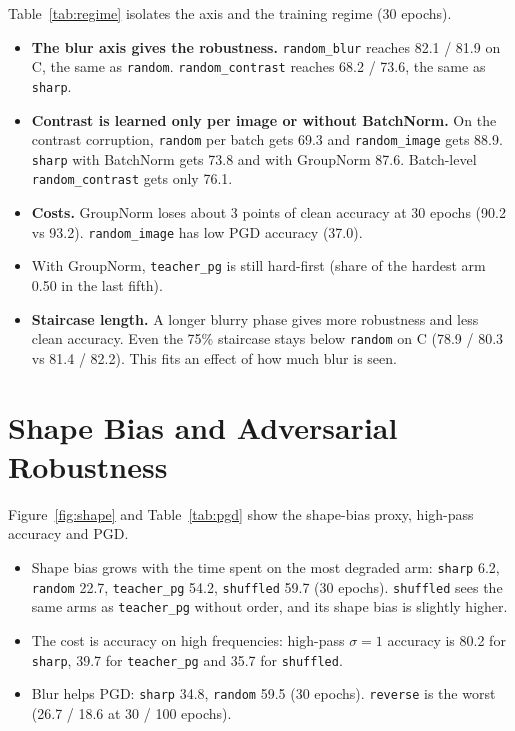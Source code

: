 \documentclass[a4paper,12pt]{report}
\newcommand{\cond}[1]{\texttt{#1}}
\begin{document}
Table~\ref{tab:regime} isolates the axis and the training regime (30 epochs).
\begin{itemize}
\item \textbf{The blur axis gives the robustness.} \cond{random\_blur} reaches 82.1 / 81.9 on C, the same as \cond{random}. \cond{random\_contrast} reaches 68.2 / 73.6, the same as \cond{sharp}.
\item \textbf{Contrast is learned only per image or without BatchNorm.} On the contrast corruption, \cond{random} per batch gets 69.3 and \cond{random\_image} gets 88.9. \cond{sharp} with BatchNorm gets 73.8 and with GroupNorm 87.6. Batch-level \cond{random\_contrast} gets only 76.1.
\item \textbf{Costs.} GroupNorm loses about 3 points of clean accuracy at 30 epochs (90.2 vs 93.2). \cond{random\_image} has low PGD accuracy (37.0).
\item With GroupNorm, \cond{teacher\_pg} is still hard-first (share of the hardest arm 0.50 in the last fifth).
\item \textbf{Staircase length.} A longer blurry phase gives more robustness and less clean accuracy. Even the 75\% staircase stays below \cond{random} on C (78.9 / 80.3 vs 81.4 / 82.2). This fits an effect of how much blur is seen.
\end{itemize}

\begin{table}[htbp]
\caption{Axis and regime ablations, 30 epochs.}
\label{tab:regime}
\begin{center}
\footnotesize

\end{center}
\end{table}

\section{Shape Bias and Adversarial Robustness}

Figure~\ref{fig:shape} and Table~\ref{tab:pgd} show the shape-bias proxy, high-pass accuracy and PGD.
\begin{itemize}
\item Shape bias grows with the time spent on the most degraded arm: \cond{sharp} 6.2, \cond{random} 22.7, \cond{teacher\_pg} 54.2, \cond{shuffled} 59.7 (30 epochs). \cond{shuffled} sees the same arms as \cond{teacher\_pg} without order, and its shape bias is slightly higher.
\item The cost is accuracy on high frequencies: high-pass $\sigma=1$ accuracy is 80.2 for \cond{sharp}, 39.7 for \cond{teacher\_pg} and 35.7 for \cond{shuffled}.
\item Blur helps PGD: \cond{sharp} 34.8, \cond{random} 59.5 (30 epochs). \cond{reverse} is the worst (26.7 / 18.6 at 30 / 100 epochs).
\end{itemize}
\end{document}
